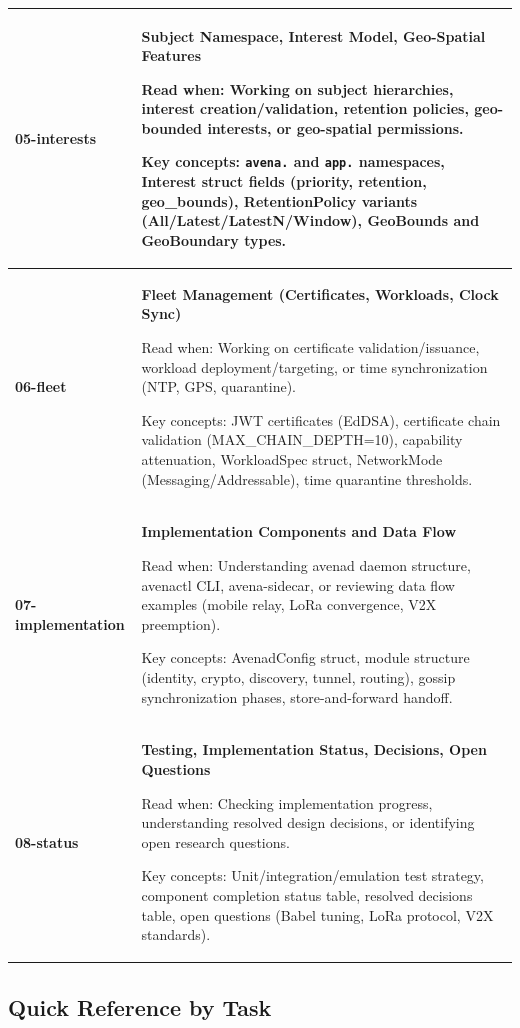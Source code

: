 \documentclass[11pt,a4paper]{article}
\begin{document}
\begin{longtable}{@{}p{3.5cm}p{9.5cm}@{}}
\textbf{05-interests} &
\textbf{Subject Namespace, Interest Model, Geo-Spatial Features}

Read when: Working on subject hierarchies, interest creation/validation, retention policies, geo-bounded interests, or geo-spatial permissions.

Key concepts: \texttt{avena.} and \texttt{app.} namespaces, Interest struct fields (priority, retention, geo\_bounds), RetentionPolicy variants (All/Latest/LatestN/Window), GeoBounds and GeoBoundary types. \\
\midrule

\textbf{06-fleet} &
\textbf{Fleet Management (Certificates, Workloads, Clock Sync)}

Read when: Working on certificate validation/issuance, workload deployment/targeting, or time synchronization (NTP, GPS, quarantine).

Key concepts: JWT certificates (EdDSA), certificate chain validation (MAX\_CHAIN\_DEPTH=10), capability attenuation, WorkloadSpec struct, NetworkMode (Messaging/Addressable), time quarantine thresholds. \\
\midrule

\textbf{07-implementation} &
\textbf{Implementation Components and Data Flow}

Read when: Understanding avenad daemon structure, avenactl CLI, avena-sidecar, or reviewing data flow examples (mobile relay, LoRa convergence, V2X preemption).

Key concepts: AvenadConfig struct, module structure (identity, crypto, discovery, tunnel, routing), gossip synchronization phases, store-and-forward handoff. \\
\midrule

\textbf{08-status} &
\textbf{Testing, Implementation Status, Decisions, Open Questions}

Read when: Checking implementation progress, understanding resolved design decisions, or identifying open research questions.

Key concepts: Unit/integration/emulation test strategy, component completion status table, resolved decisions table, open questions (Babel tuning, LoRa protocol, V2X standards). \\
\bottomrule
\end{longtable}

\subsection*{Quick Reference by Task}
\end{document}
